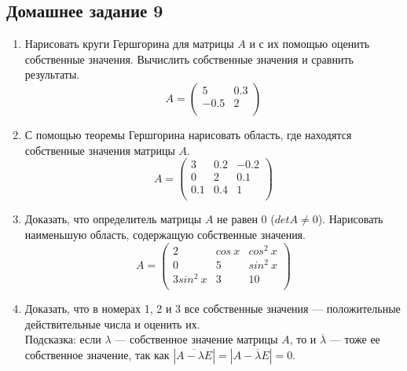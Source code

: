 \subsection{Домашнее задание 9}\begin{enumerate}
    \item Нарисовать круги Гершгорина для матрицы $A$ и с их помощью оценить собственные значения. Вычислить собственные значения и сравнить результаты.
    \[A = \begin{pmatrix}
    5 & 0.3\\
    -0.5 & 2\\
    \end{pmatrix}\]
    \item С помощью теоремы Гершгорина нарисовать область, где находятся собственные значения матрицы $A$.
    \[A = \begin{pmatrix}
    3 & 0.2 & -0.2\\
    0 & 2 & 0.1\\
    0.1 & 0.4 & 1\\
    \end{pmatrix}\]
    \item Доказать, что определитель матрицы $A$ не равен 0 ($detA\neq 0$). Нарисовать наименьшую область, содержащую собственные значения.
    \[A = \begin{pmatrix}
    2 & cos~x & cos^2~x\\
    0 & 5 & sin^2~x\\
    3sin^2~x & 3 & 10\\
    \end{pmatrix}\]
    \item Доказать, что в номерах 1, 2 и 3 все собственные значения --- положительные действительные числа и оценить их.\\
    Подсказка: если $\lambda$ --- собственное значение матрицы $A$, то и $\overline \lambda$ --- тоже ее собственное значение, так как $|\overline{A-\lambda E}|=|A-\overline\lambda E|=0$.
\end{enumerate}
